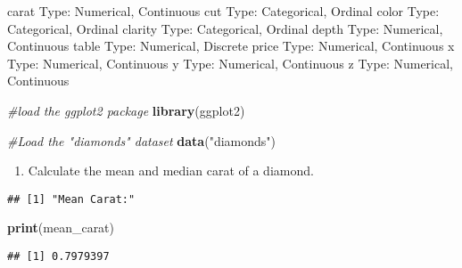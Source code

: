 \documentclass[
]{article}
\newenvironment{Shaded}{\begin{snugshade}}{\end{snugshade}}
\newcommand{\CommentTok}[1]{\textcolor[rgb]{0.56,0.35,0.01}{\textit{#1}}}
\newcommand{\FunctionTok}[1]{\textcolor[rgb]{0.13,0.29,0.53}{\textbf{#1}}}
\newcommand{\NormalTok}[1]{#1}
\newcommand{\OtherTok}[1]{\textcolor[rgb]{0.56,0.35,0.01}{#1}}
\newcommand{\SpecialCharTok}[1]{\textcolor[rgb]{0.81,0.36,0.00}{\textbf{#1}}}
\newcommand{\StringTok}[1]{\textcolor[rgb]{0.31,0.60,0.02}{#1}}
\providecommand{\tightlist}{%
  \setlength{\itemsep}{0pt}\setlength{\parskip}{0pt}}
\begin{document}
carat Type: Numerical, Continuous cut Type: Categorical, Ordinal color
Type: Categorical, Ordinal clarity Type: Categorical, Ordinal depth
Type: Numerical, Continuous table Type: Numerical, Discrete price Type:
Numerical, Continuous x Type: Numerical, Continuous y Type: Numerical,
Continuous z Type: Numerical, Continuous

\begin{Shaded}
\begin{Highlighting}[]
\CommentTok{\#load the ggplot2 package}
\FunctionTok{library}\NormalTok{(ggplot2)}

\CommentTok{\#Load the "diamonds" dataset}
\FunctionTok{data}\NormalTok{(}\StringTok{"diamonds"}\NormalTok{)}
\end{Highlighting}
\end{Shaded}

\begin{enumerate}
\def\labelenumi{\alph{enumi})}
\setcounter{enumi}{1}
\tightlist
\item
  Calculate the mean and median carat of a diamond.
\end{enumerate}

\begin{Shaded}
\end{Shaded}

\begin{verbatim}
## [1] "Mean Carat:"
\end{verbatim}

\begin{Shaded}
\begin{Highlighting}[]
\FunctionTok{print}\NormalTok{(mean\_carat)}
\end{Highlighting}
\end{Shaded}

\begin{verbatim}
## [1] 0.7979397
\end{verbatim}
\end{document}
